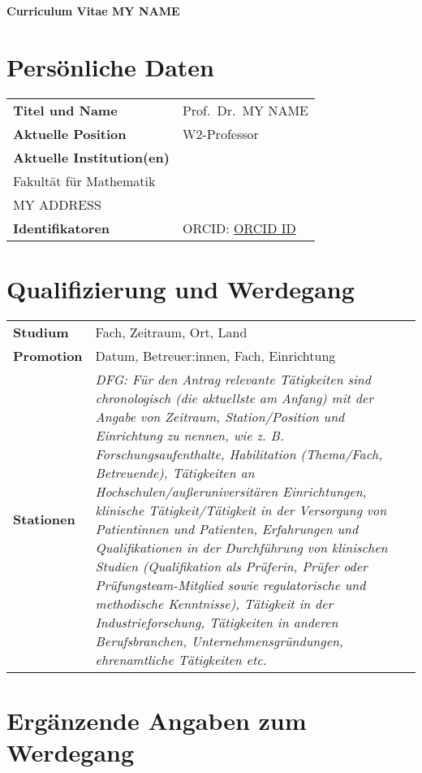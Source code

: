 \documentclass[11pt]{article}
\def\mytitle{Prof.\ Dr.\ }
\def\myname{MY NAME}
\def\myinstitute{\begin{minipage}[t]{8cm}
    MY UNIVERSITY\\
    Fakultät für Mathematik\\
    MY ADDRESS
    \end{minipage}\vspace{.3ex}}
\def\myORCID{\href{https://orcid.org/0000-0002-9271-8436}{ORCID ID}} %
\def\myidentifier{ORCID: \myORCID}
\def\myposition{W2-Professor}
\begin{document}

\thispagestyle{empty}

\mbox{}
\vspace{-9ex}

\centerline{\Large \bf Curriculum Vitae \myname}

\section*{Persönliche Daten}

\noindent
\begin{tabularx}{\textwidth}{@{}ll}
  \textbf{Titel und Name} & \mytitle \myname \\
  \textbf{Aktuelle Position} & \myposition \\
  \textbf{Aktuelle Institution(en)} & \myinstitute \\
  \textbf{Identifikatoren} & \myidentifier
\end{tabularx}


\section*{Qualifizierung und Werdegang}

\noindent
\begin{tabularx}{\textwidth}{@{}lX}
  \textbf{Studium} & Fach, Zeitraum, Ort, Land \\
  \textbf{Promotion} & Datum, Betreuer:innen, Fach, Einrichtung\\
  \textbf{Stationen} & \emph{DFG: Für den Antrag relevante Tätigkeiten sind chronologisch (die aktuellste am Anfang) mit der Angabe von Zeitraum, Station/Position und Einrichtung zu nennen, wie z. B. Forschungsaufenthalte, Habilitation (Thema/Fach, Betreuende), Tätigkeiten an Hochschulen/außeruniversitären Einrichtungen, klinische Tätigkeit/Tätigkeit in der Versorgung von Patientinnen und Patienten, Erfahrungen und Qualifikationen in der Durchführung von klinischen Studien (Qualifikation als Prüferin, Prüfer oder Prüfungsteam-Mitglied sowie regulatorische und methodische Kenntnisse), Tätigkeit in der Industrieforschung, Tätigkeiten in anderen Berufsbranchen, Unternehmensgründungen, ehrenamtliche Tätigkeiten etc.}
\end{tabularx}

\section*{Ergänzende Angaben zum Werdegang}
\end{document}
